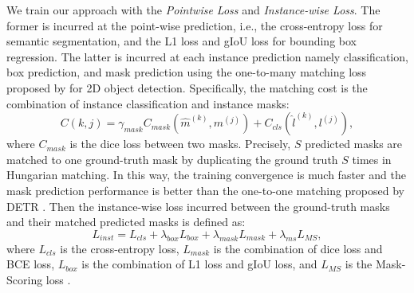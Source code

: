 \documentclass[10pt,twocolumn,letterpaper]{article}
\begin{document}
We train our approach with the \textit{Pointwise Loss} and \textit{Instance-wise Loss}. 
The former is incurred at the point-wise prediction, i.e., the cross-entropy loss for semantic segmentation, and the L1 loss and gIoU loss \cite{Rezatofighi_2018_CVPR} for bounding box regression.
The latter is incurred at each instance prediction namely classification, box prediction, and mask prediction using the one-to-many matching loss proposed by \cite{jia2022detrs} for 2D object detection.
Specifically, the matching cost is the combination of instance classification and instance masks:
% 
\begin{equation}
\label{eqn:matching_cost}
    C(k,j) = \gamma_{mask} C_{mask}(\widehat{m}^{(k)}, m^{(j)}) + C_{cls}(\widehat{l}^{(k)},l^{(j)}),
\end{equation}
where $C_{mask}$ is the dice loss \cite{sudre2017generalised} between two masks. Precisely, $S$ predicted masks are matched to one ground-truth mask by duplicating the ground truth $S$ times in Hungarian matching. In this way, the training convergence is much faster and the mask prediction performance is better than the one-to-one matching proposed by DETR \cite{carion2020end}.
% 
Then the instance-wise loss incurred between the ground-truth masks and their matched predicted masks is defined as:
\begin{equation}
    \label{eqn:inst_loss}
    L_{inst} = L_{cls} + \lambda_{box}L_{box} + \lambda_{mask}L_{mask} + \lambda_{ms}L_{MS},
\end{equation}
% 
where $L_{cls}$ is the cross-entropy loss, $L_{mask}$ is the combination of dice loss and BCE loss, $L_{box}$ is the combination of L1 loss and gIoU loss, and $L_{MS}$ is the Mask-Scoring loss \cite{huang2019msrcnn}. 





    
\end{document}
